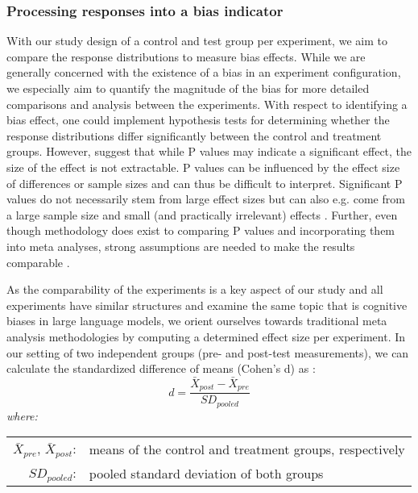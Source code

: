 \subsubsection{Processing responses into a bias indicator}
\label{methodologies:biasdetector}
\par With our study design of a control and test group per experiment, we aim to compare the response distributions to measure bias effects. While we are generally concerned with the existence of a bias in an experiment configuration, we especially aim to quantify the magnitude of the bias for more detailed comparisons and analysis between the experiments. With respect to identifying a bias effect, one could implement hypothesis tests for determining whether the response distributions differ significantly between the control and treatment groups. However, \textcite{sullivan2012using} suggest that while P values may indicate a significant effect, the size of the effect is not extractable. P values can be influenced by the effect size of differences or sample sizes and can thus be difficult to interpret. Significant P values do not necessarily stem from large effect sizes but can also e.g. come from a large sample size and small (and practically irrelevant) effects \parencite{borenstein2021introduction,sullivan2012using}. Further, even though methodology does exist to comparing P values and incorporating them into meta analyses, strong assumptions are needed to make the results comparable \parencite{borenstein2021introduction}.

\par As the comparability of the experiments is a key aspect of our study and all experiments have similar structures and examine the same topic that is cognitive biases in large language models, we orient ourselves towards traditional meta analysis methodologies by computing a determined effect size per experiment. In our setting of two independent groups (pre- and post-test measurements), we can calculate the standardized difference of means (Cohen's d) as \parencite{borenstein2021introduction,goulet2018review,morris2002combining}:
\begin{equation} \label{eq:cohensd}
d = \frac{\bar{X}_{post} - \bar{X}_{pre}}{SD_{pooled}}
\end{equation}
\hspace{0.5cm} \textit{where:} \\
\hspace*{3em}
\begin{tabular}{rl}
    $\bar{X}_{pre}$, $\bar{X}_{post}$:& means of the control and treatment groups, respectively \\
    $SD_{pooled}$:& pooled standard deviation of both groups
\end{tabular} \\

